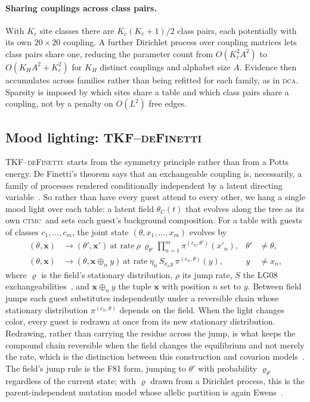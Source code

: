 \documentclass[11pt]{article}
\newcommand{\deF}{\textsc{TKF--deFinetti}}
\newcommand{\CTMC}{\textsc{ctmc}}
\newcommand{\DCA}{\textsc{dca}}
\newcommand{\eqm}{\pi}
\begin{document}
\paragraph{Sharing couplings across class pairs.} With $K_c$ site classes
there are $K_c(K_c+1)/2$ class pairs, each potentially with its own
$20\times20$ coupling. A further Dirichlet process over coupling matrices
lets class pairs share one, reducing the parameter count from
$O(K_c^2A^2)$ to $O(K_HA^2+K_c^2)$ for $K_H$ distinct couplings and alphabet
size $A$. Evidence then accumulates across families rather than being
refitted for each family, as in \DCA. Sparsity is imposed by which sites
share a table and which class pairs share a coupling, not by a penalty on
$O(L^2)$ free edges.

\subsection{Mood lighting: \deF}
\label{sec:definetti}

\deF\ starts from the symmetry principle rather than from a Potts energy. De
Finetti's theorem says that an exchangeable coupling is, necessarily, a family
of processes rendered conditionally independent by a latent directing
variable~\citep{definetti1937,aldous1985}. So rather than have every guest
attend to every other, we hang a single mood light over each table: a latent
field $\theta_C(t)$ that evolves along the tree as its own \CTMC\ and sets
each guest's background composition. For a table with guests of classes
$c_1,\dots,c_m$, the joint state $(\theta,x_1,\dots,x_m)$ evolves by
\begin{align}
\label{eq:field-jump}
(\theta,\bm x)&\to(\theta',\bm x')\ \text{at rate}\
  \rho\,\varrho_{\theta'}\prod_{n=1}^{m}\eqm^{(c_n,\theta')}(x'_n),
  & \theta'&\neq\theta,\\
\label{eq:field-subst}
(\theta,\bm x)&\to(\theta,\bm x\oplus_n y)\ \text{at rate}\
  \eta_n\,S_{x_ny}\,\eqm^{(c_n,\theta)}(y),
  & y&\neq x_n,
\end{align}
where $\varrho$ is the field's stationary distribution, $\rho$ its jump rate,
$S$ the LG08 exchangeabilities~\citep{LG08}, and $\bm x\oplus_n y$ the tuple
$\bm x$ with position $n$ set to $y$. Between field jumps each guest
substitutes independently under a reversible chain whose stationary
distribution $\eqm^{(c_n,\theta)}$ depends on the field. When the light
changes color, every guest is redrawn at once from its new stationary
distribution. Redrawing, rather than carrying the residue across the jump, is
what keeps the compound chain reversible when the field changes the
equilibrium and not merely the rate, which is the distinction between this
construction and covarion models~\citep{tuffleysteel1998}. The field's jump
rule is the F81 form, jumping to $\theta'$ with probability $\varrho_{\theta'}$
regardless of the current state; with $\varrho$ drawn from a Dirichlet
process, this is the parent-independent mutation model whose allelic
partition is again Ewens~\citep{ewens1972,Kingman1975}.
\end{document}
